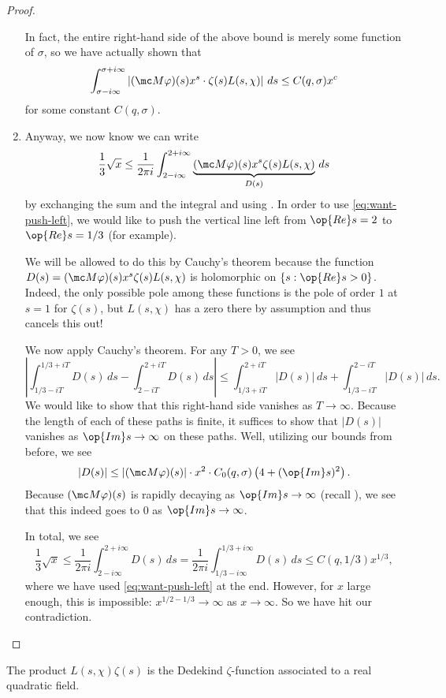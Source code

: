 \documentclass[../notes.tex]{subfiles}
\begin{document}
\begin{proof}
\begin{enumerate}
		In fact, the entire right-hand side of the above bound is merely some function of $\sigma$, so we have actually shown that
		\begin{equation}
			\int_{\sigma-i\infty}^{\sigma+i\infty}\left|(\mc M\varphi)(s)x^s\cdot\zeta(s)L(s,\chi)\right|\,ds\le C(q,\sigma)x^c \label{eq:want-push-left}
		\end{equation}
		for some constant $C(q,\sigma)$.

		\item Anyway, we now know we can write
		\[\frac13\sqrt x\le\frac1{2\pi i}\int_{2-i\infty}^{2+i\infty}\underbrace{(\mc M\varphi)(s)x^{s}\zeta(s)L(s,\chi)}_{D(s)}\,ds\]
		by exchanging the sum and the integral and using . In order to use \eqref{eq:want-push-left}, we would like to push the vertical line left from $\op{Re}s=2$ to $\op{Re}s=1/3$ (for example).
		
		We will be allowed to do this by Cauchy's theorem because the function $D(s)=(\mc M\varphi)(s)x^s\zeta(s)L(s,\chi)$ is holomorphic on $\{s:\op{Re}s>0\}$. Indeed, the only possible pole among these functions is the pole of order $1$ at $s=1$ for $\zeta(s)$, but $L(s,\chi)$ has a zero there by assumption and thus cancels this out!

		We now apply Cauchy's theorem. For any $T>0$, we see
		\[\left|\int_{1/3-iT}^{1/3+iT}D(s)\,ds-\int_{2-iT}^{2+iT}D(s)\,ds\right|\le\int_{1/3+iT}^{2+iT}|D(s)|\,ds+\int_{1/3-iT}^{2-iT}|D(s)|\,ds.\]
		We would like to show that this right-hand side vanishes as $T\to\infty$. Because the length of each of these paths is finite, it suffices to show that $|D(s)|$ vanishes as $\op{Im}s\to\infty$ on these paths. Well, utilizing our bounds from before, we see
		\[|D(s)|\le|(\mc M\varphi)(s)|\cdot x^2\cdot C_0(q,\sigma)\left(4+(\op{Im}s)^2\right).\]
		Because $(\mc M\varphi)(s)$ is rapidly decaying as $\op{Im}s\to\infty$ (recall ), we see that this indeed goes to $0$ as $\op{Im}s\to\infty$.

		In total, we see
		\[\frac13\sqrt x\le\frac1{2\pi i}\int_{2-i\infty}^{2+i\infty}D(s)\,ds=\frac1{2\pi i}\int_{1/3-i\infty}^{1/3+i\infty}D(s)\,ds\le C(q,1/3)x^{1/3},\]
		where we have used \eqref{eq:want-push-left} at the end. However, for $x$ large enough, this is impossible: $x^{1/2-1/3}\to\infty$ as $x\to\infty$. So we have hit our contradiction.
		\qedhere
	\end{enumerate}
\end{proof}
\begin{remark}
	The product $L(s,\chi)\zeta(s)$ is the Dedekind $\zeta$-function associated to a real quadratic field.
\end{remark}
\end{document}
